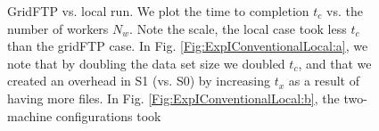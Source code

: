 \documentclass{rspublic}
\begin{document}
\begin{figure}[!ht]
\begin{center}
\caption{GridFTP vs. local run. We plot the time to
completion $t_c$ vs. the number of workers $N_w$. Note the scale, the
local case took less $t_c$ than the gridFTP case. In Fig.
\ref{Fig:ExpIConventionalLocal:a}, we note that by doubling the data set
size we doubled $t_c$, and that we created an overhead in S1 (vs. S0) by
increasing $t_x$ as a result of having more files. In Fig.
\ref{Fig:ExpIConventionalLocal:b}, the two-machine configurations took
}
\end{center}
\end{figure}
\end{document}
